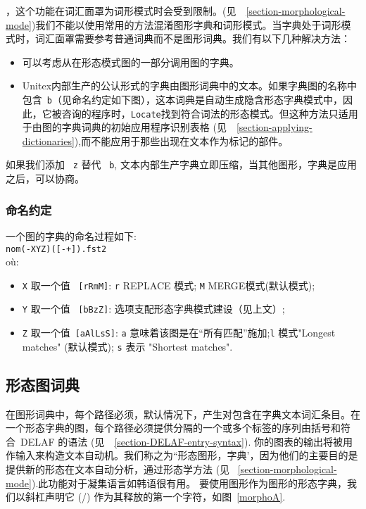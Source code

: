 \bigskip
{}，这个功能在词汇面罩为词形模式时会受到限制。(见\ ~\ref{section-morphological-mode})我们不能以使用常用的方法混淆图形字典和词形模式。当字典处于词形模式时，词汇面罩需要参考普通词典而不是图形词典。我们有以下几种解决方法：


\begin{itemize}
\item 可以考虑从在形态模式图的一部分调用图的字典。
\item Unitex内部生产的公认形式的字典由图形词典中的文本。如果字典图的名称中包含\ \verb+b+（见命名约定如下图），这本词典是自动生成隐含形态字典模式中，因此，它被咨询的程序时，\verb+Locate+找到符合词法的形态模式。但这种方法只适用于由图的字典词典的初始应用程序识别表格 (见\ ~\ref{section-applying-dictionaries}),而不能应用于那些出现在文本作为标记的部件。
\end{itemize}
如果我们添加 \ \verb+z+ 替代 \ \verb+b+, 文本内部生产字典立即压缩，当其他图形，字典是应用之后，可以协商。
 
\subsubsection{命名约定}
一个图的字典的命名过程如下:\\

\verb$nom(-XYZ)([-+]).fst2$\\

\noindent où:
\begin{itemize}
\item \verb+X+ 取一个值 \ \verb+[rRmM]+: \verb+r+ REPLACE 模式; \verb+M+
MERGE模式(默认模式);
\item \verb+Y+ 取一个值 \ \verb+[bBzZ]+: 选项支配形态字典模式建设（见上文）;
\item \verb+Z+ 取一个值\ \verb+[aAlLsS]+: \verb+a+ 意味着该图是在“所有匹配”施加;\verb+l+ 模式"Longest matches" (默认模式); 
\verb+s+ 表示 "Shortest matches".
\end{itemize}


\subsection{形态图词典}
\label{section-morphological-dictionary-graphs}
在图形词典中，每个路径必须，默认情况下，产生对包含在字典文本词汇条目。在一个形态字典的图，每个路径必须提供分隔的一个或多个标签的序列由括号和符合\ DELAF 的语法
 (见\ ~\ref{section-DELAF-entry-syntax}).
你的图表的输出将被用作输入来构造文本自动机。我们称之为``形态图形，字典'，因为他们的主要目的是提供新的形态在文本自动分析，通过形态学方法
(见 \ \ref{section-morphological-mode}).此功能对于凝集语言如韩语很有用。
要使用图形作为图形的形态字典，我们以斜杠声明它 (/) 作为其释放的第一个字符，如图\ \ref{morphoA}.

